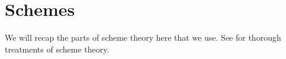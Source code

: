 \section{Schemes}
We will recap the parts of scheme theory here that we use.
See \cite{vakil,harts} for thorough treatments of scheme theory.













